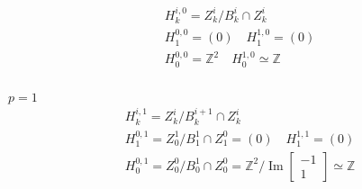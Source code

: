 \documentclass[11pt,a4paper]{report}
\DeclareMathOperator{\Ima}{Im}
\begin{document}
\begin{Ex}
              \begin{align*}
                &H_k^{i,0} = Z_k^i / B_k^i \cap Z_k^i\\
                &H_1^{0,0} = (0) \quad H_1^{1,0} = (0)\\
                &H_0^{0,0} = \mathbb{Z}^2 \quad H_0^{1,0} \simeq \mathbb{Z}\\
              \end{align*}
              \\
              \underline{$p = 1$}
              \begin{align*}
                &H_k^{i,1} = Z_k^i / B_k^{i+1} \cap Z_k^i\\
                &H_1^{0,1} = Z_0^1 / B_1^{1} \cap Z_1^0 = (0) \quad H_1^{1,1} = (0)\\
                &H_0^{0,1} = Z_0^0 / B_0^{1} \cap Z_0^0 = \mathbb{Z}^2 / \Ima \begin{bmatrix}-1\\1\end{bmatrix} \simeq \mathbb{Z}\\
              \end{align*}
              \end{Ex}
              
\end{document}
